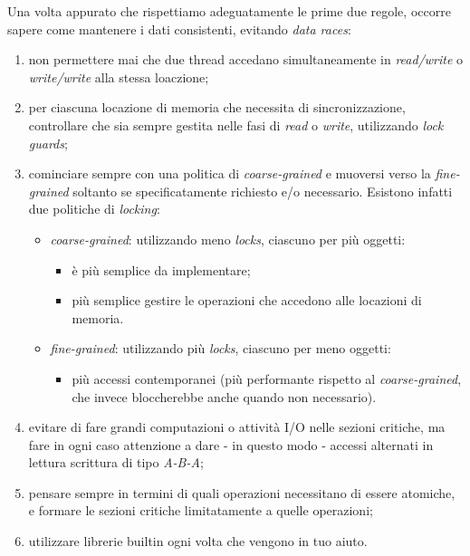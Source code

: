 Una volta appurato che rispettiamo adeguatamente le prime due regole, occorre sapere come mantenere i dati consistenti, evitando \textit{data races}:
\begin{enumerate}
	\item non permettere mai che due thread accedano simultaneamente in \textit{read/write} o \textit{write/write} alla stessa loaczione;
	\item per ciascuna locazione di memoria che necessita di sincronizzazione, controllare che sia sempre gestita nelle fasi di \textit{read} o \textit{write}, utilizzando \textit{lock guards};
	\item cominciare sempre con una politica di \textit{coarse-grained} e muoversi verso la \textit{fine-grained} soltanto se specificatamente richiesto e/o necessario. Esistono infatti due politiche di \textit{locking}:
	\begin{itemize}
		\item \textit{coarse-grained}: utilizzando meno \textit{locks}, ciascuno per più oggetti:
		\begin{itemize}
			\item è più semplice da implementare;
			\item più semplice gestire le operazioni che accedono alle locazioni di memoria.
		\end{itemize}
		\item \textit{fine-grained}: utilizzando più \textit{locks}, ciascuno per meno oggetti:
		\begin{itemize}
			\item più accessi contemporanei (più performante rispetto al \textit{coarse-grained}, che invece bloccherebbe anche quando non necessario).
		\end{itemize}
	\end{itemize}
	\item evitare di fare grandi computazioni o attività I/O nelle sezioni critiche, ma fare in ogni caso attenzione a dare - in questo modo - accessi alternati in lettura scrittura di tipo \textit{A-B-A};
	\item pensare sempre in termini di quali operazioni necessitano di essere atomiche, e formare le sezioni critiche limitatamente a quelle operazioni;
	\item utilizzare librerie builtin ogni volta che vengono in tuo aiuto.
\end{enumerate}


